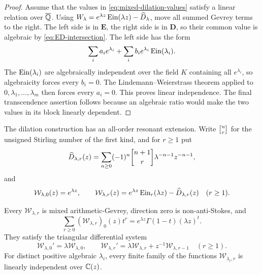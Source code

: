 \begin{proof}
Assume that the values in \eqref{eq:mixed-dilation-values} satisfy a
linear relation over \(\overline{\mathbb Q}\).  Using
\(W_\lambda=e^{\lambda z}\operatorname{Ein}(\lambda z)-\widehat D_\lambda\), move all
summed Gevrey terms to the right.  The left side is in \(\mathbf E\), the
right side is in \(\mathbf D\), so their common value is algebraic by
\eqref{eq:ED-intersection}.  The left side has the form
\[
 \sum_i a_i e^{\lambda_i}
 +\sum_i b_i e^{\lambda_i}\operatorname{Ein}(\lambda_i).
\]
The \(\operatorname{Ein}(\lambda_i)\) are algebraically independent over the field \(K\)
containing all \(e^{\lambda_i}\), so algebraicity forces every \(b_i=0\).
The Lindemann--Weierstrass theorem applied to
\(0,\lambda_1,\ldots,\lambda_m\) then forces every \(a_i=0\).  This proves
linear independence.  The final transcendence assertion follows because
an algebraic ratio would make the two values in its block linearly
dependent.
\end{proof}

The dilation construction has an all-order resonant extension.  Write
\(\stirling{n}{r}\) for the unsigned Stirling number of the first kind, and for
\(r\ge1\) put
\begin{equation}\label{eq:all-order-Dhat}
 \widehat D_{\lambda,r}(z)=
 \sum_{n\ge0}(-1)^n\stirling{n+1}{r}
 \lambda^{-n-1}z^{-n-1},
\end{equation}
and
\begin{equation}\label{eq:all-order-mixed-family}
 \mathcal W_{\lambda,0}(z)=e^{\lambda z},\qquad
 \mathcal W_{\lambda,r}(z)
 =e^{\lambda z}\operatorname{Ein}_r(\lambda z)-\widehat D_{\lambda,r}(z)
 \quad(r\ge1).
\end{equation}

\begin{proposition}
\label{prop:all-order-mixed-jet}
Every \(\mathcal W_{\lambda,r}\) is mixed arithmetic-Gevrey, direction zero
is non-anti-Stokes, and
\begin{equation}\label{eq:all-order-mixed-generating}
 \boxed{\displaystyle
 \sum_{r\ge0}(\mathcal W_{\lambda,r})_0(z)t^r
 =e^{\lambda z}\Gamma(1-t)(\lambda z)^t.}
\end{equation}
They satisfy the triangular differential system
\begin{equation}\label{eq:all-order-mixed-system}
 \mathcal W_{\lambda,0}'=\lambda\mathcal W_{\lambda,0},
 \qquad
 \mathcal W_{\lambda,r}'
 =\lambda\mathcal W_{\lambda,r}+z^{-1}\mathcal W_{\lambda,r-1}
 \quad(r\ge1).
\end{equation}
For distinct positive algebraic \(\lambda_i\), every finite family of the
functions \(\mathcal W_{\lambda_i,r}\) is linearly independent over
\(\mathbb C(z)\).
\end{proposition}

